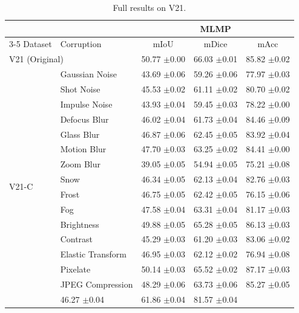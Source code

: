 \documentclass{article}
\begin{document}
\begin{table}[t]
\centering
\caption{Full results on V21.}
\label{tab:results_v21}
\begin{tabular}{ll|ccc}
\toprule
 & & \multicolumn{3}{c}{MLMP} \\
\cmidrule(lr){3-5}
Dataset & Corruption & mIoU & mDice & mAcc \\
\midrule
\multicolumn{2}{l}{V21 (Original)} & 50.77 {\scriptsize $\pm$0.00} & 66.03 {\scriptsize $\pm$0.01} & 85.82 {\scriptsize $\pm$0.02} \\
\multirow{16}{*}{V21-C} & Gaussian Noise & 43.69 {\scriptsize $\pm$0.06} & 59.26 {\scriptsize $\pm$0.06} & 77.97 {\scriptsize $\pm$0.03} \\
 & Shot Noise & 45.53 {\scriptsize $\pm$0.02} & 61.11 {\scriptsize $\pm$0.02} & 80.70 {\scriptsize $\pm$0.02} \\
 & Impulse Noise & 43.93 {\scriptsize $\pm$0.04} & 59.45 {\scriptsize $\pm$0.03} & 78.22 {\scriptsize $\pm$0.00} \\
 & Defocus Blur & 46.02 {\scriptsize $\pm$0.04} & 61.73 {\scriptsize $\pm$0.04} & 84.46 {\scriptsize $\pm$0.09} \\
 & Glass Blur & 46.87 {\scriptsize $\pm$0.06} & 62.45 {\scriptsize $\pm$0.05} & 83.92 {\scriptsize $\pm$0.04} \\
 & Motion Blur & 47.70 {\scriptsize $\pm$0.03} & 63.25 {\scriptsize $\pm$0.02} & 84.41 {\scriptsize $\pm$0.00} \\
 & Zoom Blur & 39.05 {\scriptsize $\pm$0.05} & 54.94 {\scriptsize $\pm$0.05} & 75.21 {\scriptsize $\pm$0.08} \\
 & Snow & 46.34 {\scriptsize $\pm$0.05} & 62.13 {\scriptsize $\pm$0.04} & 82.76 {\scriptsize $\pm$0.03} \\
 & Frost & 46.75 {\scriptsize $\pm$0.05} & 62.42 {\scriptsize $\pm$0.05} & 76.15 {\scriptsize $\pm$0.06} \\
 & Fog & 47.58 {\scriptsize $\pm$0.04} & 63.31 {\scriptsize $\pm$0.04} & 81.17 {\scriptsize $\pm$0.03} \\
 & Brightness & 49.88 {\scriptsize $\pm$0.05} & 65.28 {\scriptsize $\pm$0.05} & 86.13 {\scriptsize $\pm$0.03} \\
 & Contrast & 45.29 {\scriptsize $\pm$0.03} & 61.20 {\scriptsize $\pm$0.03} & 83.06 {\scriptsize $\pm$0.02} \\
 & Elastic Transform & 46.95 {\scriptsize $\pm$0.03} & 62.12 {\scriptsize $\pm$0.02} & 76.94 {\scriptsize $\pm$0.08} \\
 & Pixelate & 50.14 {\scriptsize $\pm$0.03} & 65.52 {\scriptsize $\pm$0.02} & 87.17 {\scriptsize $\pm$0.03} \\
 & JPEG Compression & 48.29 {\scriptsize $\pm$0.06} & 63.73 {\scriptsize $\pm$0.06} & 85.27 {\scriptsize $\pm$0.05} \\
\cmidrule(l){2-5}
\multicolumn{2}{l}{\textit{V21-C Average}} & 46.27 {\scriptsize $\pm$0.04} & 61.86 {\scriptsize $\pm$0.04} & 81.57 {\scriptsize $\pm$0.04} \\
\bottomrule
\end{tabular}
\end{table}
\end{document}
